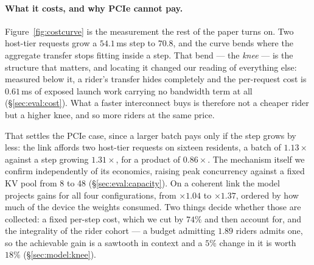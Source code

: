 \paragraph{What it costs, and why PCIe cannot pay.}
Figure~\ref{fig:costcurve} is the measurement the rest of the paper turns on. Two
host-tier requests grow a $54.1$\,ms step to $70.8$, and the curve bends where the
aggregate transfer stops fitting inside a step. That bend --- the \emph{knee} --- is
the structure that matters, and locating it changed our reading of everything else:
measured below it, a rider's transfer hides completely and the per-request cost is
$0.61$\,ms of exposed launch work carrying no bandwidth term at all
(\S\ref{sec:eval:cost}). What a faster interconnect buys is therefore not a cheaper
rider but a higher knee, and so more riders at the same price.

That settles the PCIe case, since a larger batch pays only if the step grows by
less: the link affords two host-tier requests on sixteen residents, a batch of
$1.13\times$ against a step growing $1.31\times$, for a product of $0.86\times$.
The mechanism itself we confirm independently of its economics, raising peak
concurrency against a fixed KV pool from 8 to 48 (\S\ref{sec:eval:capacity}).
On a coherent link the model projects gains for all four configurations, from
$\times 1.04$ to $\times 1.37$, ordered by how much of the device the weights
consumed. Two things decide whether those are collected: a fixed per-step cost,
which we cut by $74\%$ and then account for, and the integrality of the rider
cohort --- a budget admitting $1.89$ riders admits one, so the achievable gain is a
sawtooth in context and a $5\%$ change in it is worth $18\%$
(\S\ref{sec:model:knee}).
